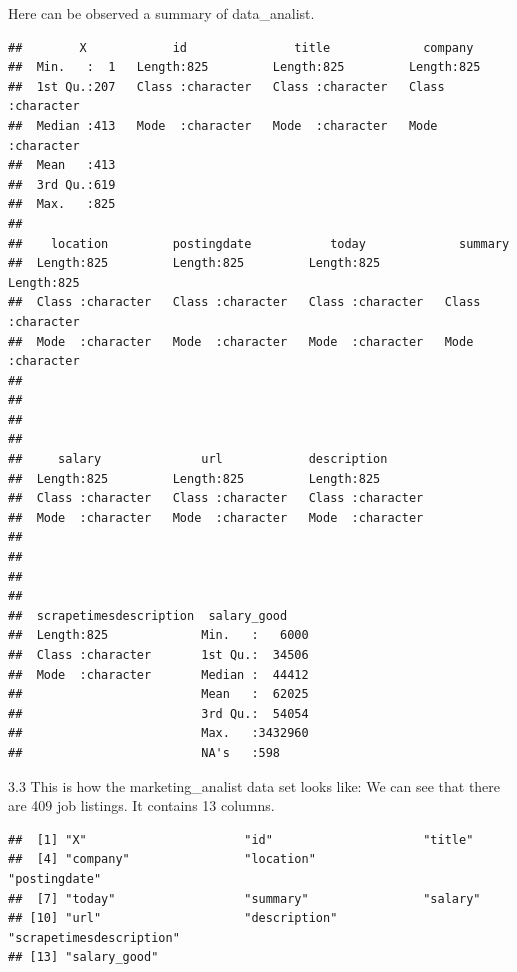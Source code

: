 \documentclass[
]{article}
\begin{document}
Here can be observed a summary of data\_analist.

\begin{verbatim}
##        X            id               title             company         
##  Min.   :  1   Length:825         Length:825         Length:825        
##  1st Qu.:207   Class :character   Class :character   Class :character  
##  Median :413   Mode  :character   Mode  :character   Mode  :character  
##  Mean   :413                                                           
##  3rd Qu.:619                                                           
##  Max.   :825                                                           
##                                                                        
##    location         postingdate           today             summary         
##  Length:825         Length:825         Length:825         Length:825        
##  Class :character   Class :character   Class :character   Class :character  
##  Mode  :character   Mode  :character   Mode  :character   Mode  :character  
##                                                                             
##                                                                             
##                                                                             
##                                                                             
##     salary              url            description       
##  Length:825         Length:825         Length:825        
##  Class :character   Class :character   Class :character  
##  Mode  :character   Mode  :character   Mode  :character  
##                                                          
##                                                          
##                                                          
##                                                          
##  scrapetimesdescription  salary_good     
##  Length:825             Min.   :   6000  
##  Class :character       1st Qu.:  34506  
##  Mode  :character       Median :  44412  
##                         Mean   :  62025  
##                         3rd Qu.:  54054  
##                         Max.   :3432960  
##                         NA's   :598
\end{verbatim}

3.3 This is how the marketing\_analist data set looks like: We can see
that there are 409 job listings. It contains 13 columns.

\begin{verbatim}
##  [1] "X"                      "id"                     "title"                 
##  [4] "company"                "location"               "postingdate"           
##  [7] "today"                  "summary"                "salary"                
## [10] "url"                    "description"            "scrapetimesdescription"
## [13] "salary_good"
\end{verbatim}
\end{document}
